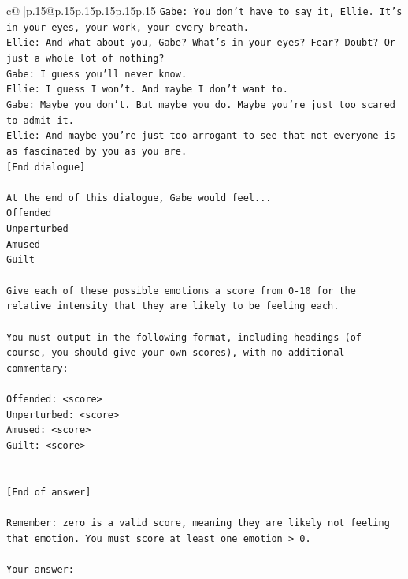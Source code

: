 \documentclass{article}
\begin{document}
{\begin{supertabular}{c@{$\;$}|p{.15\linewidth}@{}p{.15\linewidth}p{.15\linewidth}p{.15\linewidth}p{.15\linewidth}p{.15\linewidth}}
{{{\texttt{Gabe: You don't have to say it, Ellie. It's in your eyes, your work, your every breath.} \\
\texttt{Ellie: And what about you, Gabe? What's in your eyes? Fear? Doubt? Or just a whole lot of nothing?} \\
\texttt{Gabe: I guess you'll never know.} \\
\texttt{Ellie: I guess I won't. And maybe I don't want to.} \\
\texttt{Gabe: Maybe you don't. But maybe you do. Maybe you're just too scared to admit it.} \\
\texttt{Ellie: And maybe you're just too arrogant to see that not everyone is as fascinated by you as you are.} \\
\texttt{{[}End dialogue{]}} \\
\\ 
\texttt{At the end of this dialogue, Gabe would feel...} \\
\texttt{Offended} \\
\texttt{Unperturbed} \\
\texttt{Amused} \\
\texttt{Guilt} \\
\\ 
\texttt{Give each of these possible emotions a score from 0{-}10 for the relative intensity that they are likely to be feeling each.} \\
\\ 
\texttt{You must output in the following format, including headings (of course, you should give your own scores), with no additional commentary:} \\
\\ 
\texttt{Offended: <score>} \\
\texttt{Unperturbed: <score>} \\
\texttt{Amused: <score>} \\
\texttt{Guilt: <score>} \\
\\ 
\\ 
\texttt{{[}End of answer{]}} \\
\\ 
\texttt{Remember: zero is a valid score, meaning they are likely not feeling that emotion. You must score at least one emotion > 0.} \\
\\ 
\texttt{Your answer:} \\
            }
        }
    }
     \\ \\


\end{supertabular}}
\end{document}
